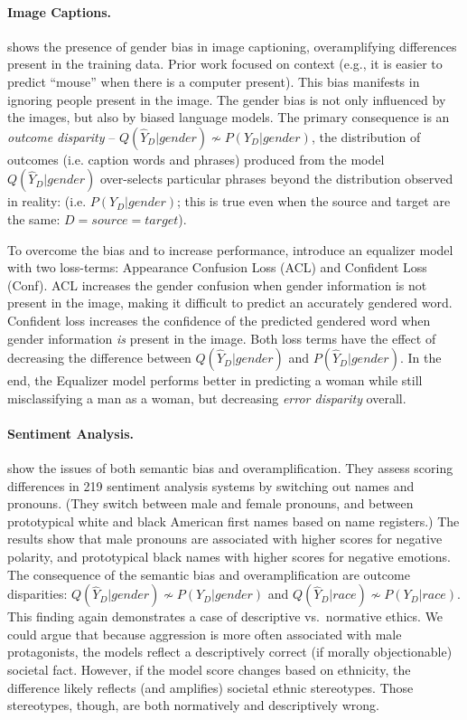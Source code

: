 \paragraph*{Image Captions.}
\label{appendix:case2}
 shows the presence of gender bias in image captioning, overamplifying differences present in the training data. Prior work focused on context (e.g., it is easier to predict ``mouse'' when there is a computer present). This bias manifests in ignoring people present in the image. The gender bias is not only influenced by the images, but also by biased language models. The primary consequence is an \textit{outcome disparity} -- $Q(\hat{Y}_D|gender) \nsim P(Y_D|gender)$, the distribution of outcomes (i.e. caption words and phrases) produced from the model $Q(\hat{Y}_{D}|gender)$ over-selects particular phrases beyond the distribution observed in reality: (i.e.  $P(Y_{D}|gender)$; this is true even when the source and target are the same: $D = source = target$). 

To overcome the bias and to increase performance,  introduce an equalizer model with two loss-terms: Appearance Confusion Loss (ACL) and Confident Loss (Conf). ACL increases the gender confusion when gender information is not present in the image, making it difficult to predict an accurately gendered word. Confident loss increases the confidence of the predicted gendered word when gender information \textit{is} present in the image. Both loss terms have the effect of decreasing the difference between $Q(\hat{Y}_D|gender)$ and $P(\hat{Y}_D|gender)$. In the end, the Equalizer model performs better in predicting a woman while still misclassifying a man as a woman, but decreasing \textit{error disparity} overall. 

\paragraph*{Sentiment Analysis.}
\label{appendix:case3}
 show the issues of both semantic bias and overamplification. They assess scoring differences in 219 sentiment analysis systems by switching out names and pronouns. (They switch between male and female pronouns, and between prototypical white and black American first names based on name registers.) The results show that male pronouns are associated with higher scores for negative polarity, and prototypical black names with higher scores for negative emotions. The consequence of the semantic bias and overamplification are outcome disparities:  $Q(\hat{Y}_D|gender) \nsim P(Y_D|gender)$ and $Q(\hat{Y}_D|race) \nsim P(Y_D|race)$. 
This finding again demonstrates a case of descriptive vs.\ normative ethics. We could argue that because aggression is more often associated with male protagonists, the models reflect a descriptively correct (if morally objectionable) societal fact. However, if the model score changes based on ethnicity, the difference likely reflects (and amplifies) societal ethnic stereotypes. Those stereotypes, though, are both normatively and descriptively wrong. 

